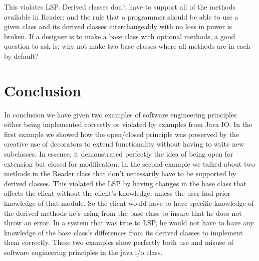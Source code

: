 \documentclass[12pt]{article}
\begin{document}
This violates LSP. Derived classes don't have to support all of the methods available in Reader; and the rule that a programmer should be able to use a given class and its derived classes interchangeably with no loss in power is broken. If a designer is to make a base class with optional methods, a good question to ask is: why not make two base classes where all methods are in each by default? 





\section{Conclusion}
In conclusion we have given two examples of software engineering principles either being implemented correctly or violated by examples from Java IO. In the first example we showed how the open/closed principle was preserved by the creative use of decorators to extend functionality without having to write new subclasses. In essence, it demonstrated perfectly the idea of being open for extension but closed for modification. In the second example we talked about two methods in the Reader class that don't necessarily have to be supported by derived classes. This violated the LSP by having changes in the base class that affects the client without the client's knowledge, unless the user had prior knowledge of that module. So the client would have to have specific knowledge of the derived methods he's using from the base class to insure that he does not throw an error. In a system that was true to LSP, he would not have to have any knowledge of the base class's differences from its derived classes to implement them correctly. These two examples show perfectly both use and misuse of software engineering principles in the java i/o class.
\end{document}
